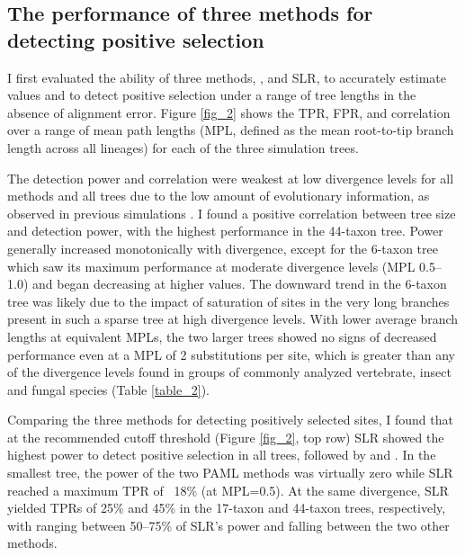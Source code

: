\subsection{The performance of three methods for detecting \sw positive selection}
I first evaluated the ability of three \sw methods, \mtwo, \meight
and SLR, to accurately estimate \sw \omg values and to detect
positive selection under a range of tree lengths in the absence of
alignment error. Figure \ref{fig_2} shows the TPR, FPR, \tpr{} and \sw
\omg correlation over a range of mean path lengths
(MPL, defined as the mean root-to-tip branch
  length across all lineages) for each of the three simulation trees.

The detection power and \omg correlation were weakest at low
divergence levels for all methods and all trees due to the low amount
of evolutionary information, as observed in previous simulations
\citep{Anisimova2002}. I found a positive correlation between
tree size and detection power, with the highest performance in the
44-taxon tree. Power generally increased monotonically with
divergence, except for the 6-taxon tree which saw its maximum
performance at moderate divergence levels (MPL 0.5--1.0) and began
decreasing at higher values. The downward trend in the 6-taxon tree
was likely due to the impact of saturation of \syn sites in the
very long branches present in such a sparse tree at high divergence
levels. With lower average branch lengths at equivalent MPLs, the two
larger trees showed no signs of decreased performance even at a MPL of
2 substitutions per site, which is greater than any of the divergence
levels found in groups of commonly analyzed vertebrate, insect and
fungal species (Table \ref{table_2}).

Comparing the three methods for detecting positively selected sites, I found that at the
recommended cutoff threshold (Figure \ref{fig_2}, top row) SLR showed
the highest power to detect positive selection in all trees, followed
by \meight and \mtwo. In the smallest tree, the power of the two
PAML methods was virtually zero while SLR reached a maximum TPR of ~18\%
(at MPL=0.5). At the same divergence, SLR yielded TPRs of 25\% and 45\%
in the 17-taxon and 44-taxon trees, respectively, with \mtwo ranging
between 50--75\% of SLR's power and \meight falling between the two
other methods.

